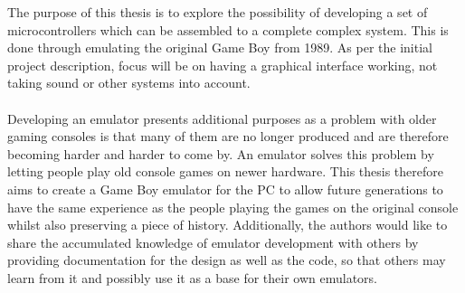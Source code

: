 The purpose of this thesis is to explore the possibility of developing a set of microcontrollers which can be assembled to a complete complex system. This is done through emulating the original Game Boy from 1989. As per the initial project description, focus will be on having a graphical interface working, not taking sound or other systems into account. 
\\\\
Developing an emulator presents additional purposes as a problem with older gaming consoles is that many of them are no longer produced and are therefore becoming harder and harder to come by. An emulator solves this problem by letting people play old console games on newer hardware. This thesis therefore aims to create a Game Boy emulator for the PC to allow future generations to have the same experience as the people playing the games on the original console whilst also preserving a piece of history. Additionally, the authors would like to share the accumulated knowledge of emulator development with others by providing documentation for the design as well as the code, so that others may learn from it and possibly use it as a base for their own emulators.

